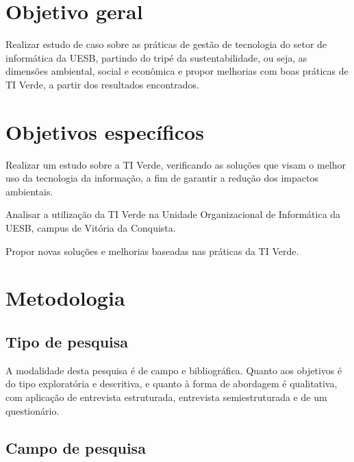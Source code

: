\section{Objetivo geral}
Realizar estudo de caso sobre as práticas de gestão de tecnologia do setor de informática da UESB, partindo do tripé da sustentabilidade, ou seja, as dimensões ambiental, social e econômica e propor melhorias com boas práticas de TI Verde, a partir dos resultados encontrados.



\section{Objetivos específicos}
Realizar um estudo sobre a TI Verde, verificando as soluções que visam o melhor uso da tecnologia da informação, a fim de garantir a redução dos impactos ambientais.
 
Analisar a utilização da TI Verde na Unidade Organizacional de Informática da UESB, campus de Vitória da Conquista.  

Propor novas soluções e melhorias baseadas nas práticas da TI Verde.


\section{Metodologia}

\subsection{Tipo de pesquisa}
A modalidade desta pesquisa é de campo e bibliográfica. Quanto aos objetivos é do tipo exploratória e descritiva, e quanto à forma de abordagem é qualitativa, com aplicação de entrevista estruturada, entrevista semiestruturada e de um questionário.

\subsection{Campo de pesquisa}

